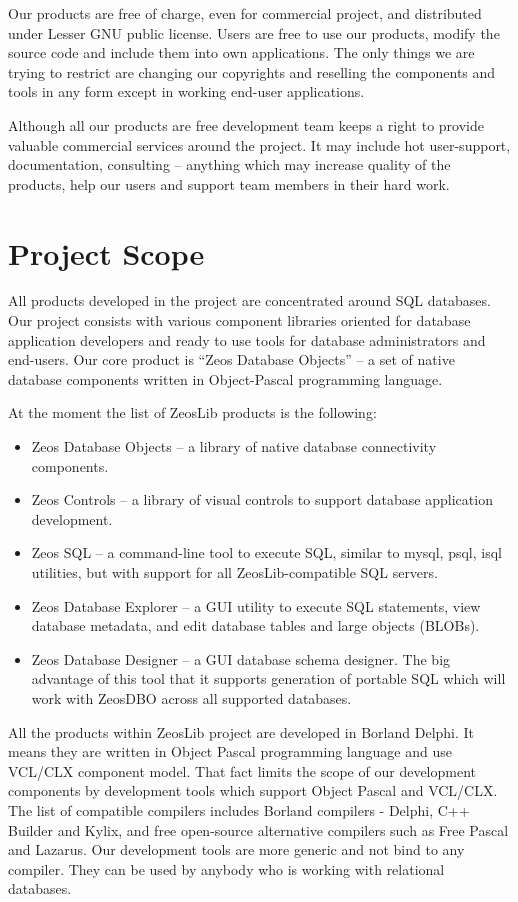 \documentclass[a4paper,12pt,oneside]{book}
\begin{document}
Our products are free of charge, even for commercial project, and distributed under Lesser GNU public license.
Users are free to use our products, modify the source code and include them into own applications.
The only things we are trying to restrict are changing our copyrights and reselling the components and tools in any form except in working end-user applications.  

Although all our products are free development team keeps a right to provide valuable commercial services around the project.
It may include hot user-support, documentation, consulting – anything which may increase quality of the products, help our users and support team members in their hard work.

\section{Project Scope}
All products developed in the project are concentrated around SQL databases.
Our project consists with various component libraries oriented for database application developers and ready to use tools for database administrators and end-users.
Our core product is “Zeos Database Objects” – a set of native database components written in Object-Pascal programming language.

At the moment the list of ZeosLib products is the following:
\begin{itemize}
  \item Zeos Database Objects – a library of native database connectivity components.
  \item Zeos Controls – a library of visual controls to support database application development.
	\item Zeos SQL – a command-line tool to execute SQL, similar to mysql, psql, isql utilities, but with support for all ZeosLib-compatible SQL servers.
	\item Zeos Database Explorer – a GUI utility to execute SQL statements, view database metadata, and edit database tables and large objects (BLOBs).
	\item
	  Zeos Database Designer – a GUI database schema designer.
		The big advantage of this tool that it supports generation of portable SQL which will work with ZeosDBO across all supported databases.
\end{itemize}

All the products within ZeosLib project are developed in Borland Delphi.
It means they are written in Object Pascal programming language and use VCL/CLX component model.
That fact limits the scope of our development components by development tools which support Object Pascal and VCL/CLX.
The list of compatible compilers includes Borland compilers - Delphi, C++ Builder and Kylix, and free open-source alternative compilers such as Free Pascal and Lazarus.
Our development tools are more generic and not bind to any compiler. They can be used by anybody who is working with relational databases.
\end{document}
